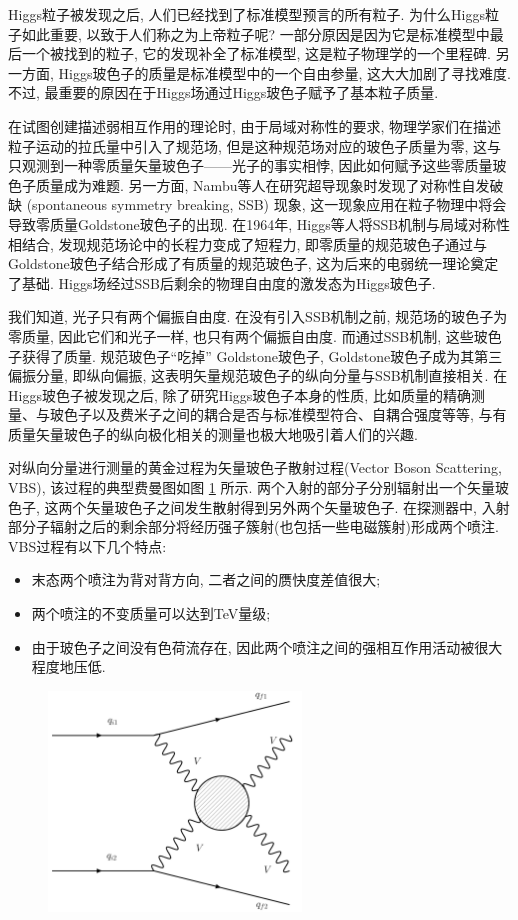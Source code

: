 \documentclass{SCIS2020cn}
\begin{document}
Higgs粒子被发现之后, 人们已经找到了标准模型预言的所有粒子. 为什么Higgs粒子如此重要, 以致于人们称之为上帝粒子呢? 一部分原因是因为它是标准模型中最后一个被找到的粒子, 它的发现补全了标准模型, 这是粒子物理学的一个里程碑. 另一方面, Higgs玻色子的质量是标准模型中的一个自由参量, 这大大加剧了寻找难度. 不过, 最重要的原因在于Higgs场通过Higgs玻色子赋予了基本粒子质量. 

在试图创建描述弱相互作用的理论时, 由于局域对称性的要求, 物理学家们在描述粒子运动的拉氏量中引入了规范场, 但是这种规范场对应的玻色子质量为零, 这与只观测到一种零质量矢量玻色子——光子的事实相悖, 因此如何赋予这些零质量玻色子质量成为难题. 另一方面, Nambu等人在研究超导现象时发现了对称性自发破缺 (spontaneous symmetry breaking, SSB) 现象, 这一现象应用在粒子物理中将会导致零质量Goldstone玻色子的出现. 在1964年, Higgs等人将SSB机制与局域对称性相结合, 发现规范场论中的长程力变成了短程力, 即零质量的规范玻色子通过与Goldstone玻色子结合形成了有质量的规范玻色子, 这为后来的电弱统一理论奠定了基础. Higgs场经过SSB后剩余的物理自由度的激发态为Higgs玻色子.

我们知道, 光子只有两个偏振自由度. 在没有引入SSB机制之前, 规范场的玻色子为零质量, 因此它们和光子一样, 也只有两个偏振自由度. 而通过SSB机制, 这些玻色子获得了质量. 规范玻色子``吃掉'' Goldstone玻色子, Goldstone玻色子成为其第三偏振分量, 即纵向偏振, 这表明矢量规范玻色子的纵向分量与SSB机制直接相关. 在Higgs玻色子被发现之后, 除了研究Higgs玻色子本身的性质, 比如质量的精确测量、与玻色子以及费米子之间的耦合是否与标准模型符合、自耦合强度等等, 与有质量矢量玻色子的纵向极化相关的测量也极大地吸引着人们的兴趣. 

对纵向分量进行测量的黄金过程为矢量玻色子散射过程(Vector Boson Scattering, VBS), 该过程的典型费曼图如图 \ref{fig:3} 所示. 两个入射的部分子分别辐射出一个矢量玻色子, 这两个矢量玻色子之间发生散射得到另外两个矢量玻色子. 在探测器中, 入射部分子辐射之后的剩余部分将经历强子簇射(也包括一些电磁簇射)形成两个喷注. VBS过程有以下几个特点: 

\begin{itemize}
\item 末态两个喷注为背对背方向, 二者之间的赝快度差值很大;
\item 两个喷注的不变质量可以达到TeV量级;
\item 由于玻色子之间没有色荷流存在, 因此两个喷注之间的强相互作用活动被很大程度地压低.
\end{itemize}

\begin{figure}[ht!]
\centering
\includegraphics[width=2.65104in]{Figure-3.pdf}
\label{fig:3}
\end{figure}
\end{document}
